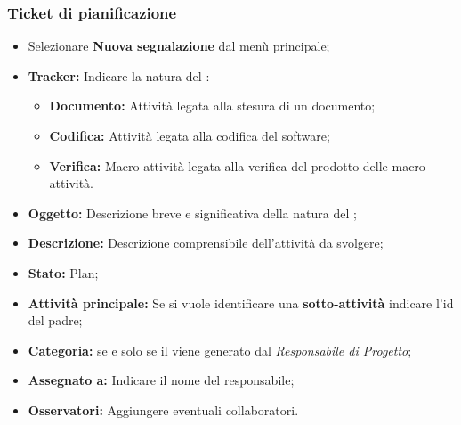             \subsubsection{Ticket di pianificazione}
              \begin{itemize}
                \item Selezionare \textbf{Nuova segnalazione} dal menù principale;
                \item \textbf{Tracker: }Indicare la natura del :
                \bgroup
                  \begin{itemize}
                    \item \textbf{Documento: }Attività legata alla stesura di un documento;
                    \item \textbf{Codifica: }Attività legata alla  codifica del software;
                    \item \textbf{Verifica: }Macro-attività legata alla verifica del prodotto delle macro-attività.
                  \end{itemize}
                \egroup
                \item \textbf{Oggetto: }Descrizione breve e significativa della natura del ;
                \item \textbf{Descrizione: }Descrizione comprensibile dell'attività da svolgere;
                \item \textbf{Stato: }Plan;
                \item \textbf{Attività principale: }Se si vuole identificare una \textbf{sotto-attività} indicare l'id del  padre;
                \item \textbf{Categoria: } se e solo se il  viene generato dal \emph{Responsabile di Progetto};
                \item \textbf{Assegnato a: }Indicare il nome del responsabile;
                \item \textbf{Osservatori: }Aggiungere eventuali collaboratori.
              \end{itemize}

